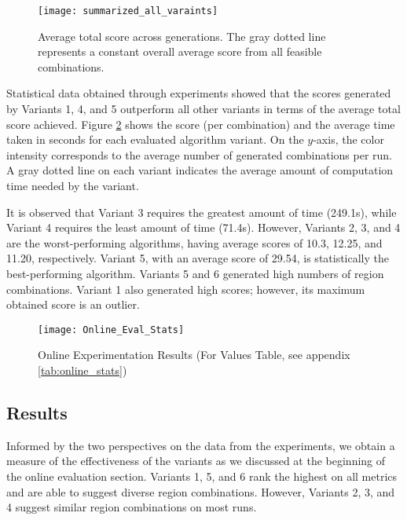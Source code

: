 \begin{figure}[h]
    \centering
    \texttt{[image: summarized\_all\_varaints]}
    \caption[Average generational total score of all variants]{Average total score across generations. The gray dotted line represents a constant overall average score from all feasible combinations.}
    \label{apx:fig:alg_comparison_generational}
\end{figure}

Statistical data obtained through experiments showed that the scores generated by Variants
1, 4, and 5 outperform all other variants in terms of the average total score achieved. Figure \ref{fig:alg_comparison_online} shows the score (per combination) and the average time taken in seconds for each evaluated algorithm variant. On the $y$-axis, the color intensity corresponds to the average number of generated combinations per run. A gray dotted line on each variant indicates the average amount of computation time needed by the variant.

It is observed that Variant 3 requires the greatest amount of time (249.1s), while Variant 4 requires the least amount of time (71.4s). However, Variants 2, 3, and 4 are the worst-performing algorithms, having average scores of 10.3, 12.25, and 11.20, respectively. Variant 5, with an average score of 29.54, is statistically the best-performing algorithm. Variants 5 and 6 generated high numbers of region combinations. Variant 1 also generated high scores; however, its maximum obtained score is an outlier.

\begin{figure}[ht]
    \centering
    \texttt{[image: Online\_Eval\_Stats]}
    \caption[Per Test Variant Online Experimentation Results]{Online Experimentation Results (For Values Table, see appendix \ref{tab:online_stats})}
    \label{fig:alg_comparison_online}
\end{figure}



\subsection{Results}
Informed by the two perspectives on the data from the experiments, we obtain a measure of the effectiveness of the variants as we discussed at the beginning of the online evaluation section. Variants 1, 5, and 6 rank the highest on all metrics and are able to suggest diverse region combinations. However, Variants 2, 3, and 4 suggest similar region combinations on most runs.

